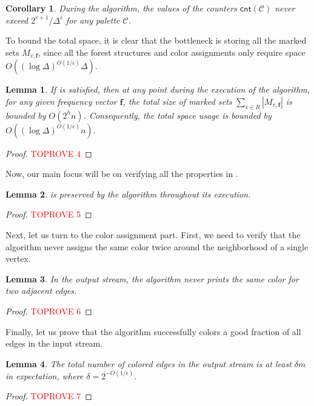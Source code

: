 \documentclass[11pt,a4paper]{article}
\newtheorem{lemma}{Lemma}[section]
\newtheorem{corollary}{Corollary}[section]
\newcommand{\freq}{\mathbf{f}}
\newcommand{\clr}{\mathcal{C}}
\newcommand{\cnt}{\mathsf{cnt}}
\newcommand{\brac}[1]{\left(#1\right)}
\begin{document}
\begin{corollary}\label{cnt-bound}
	During the algorithm, the values of the counters $\cnt(\clr)$ never exceed $2^{r+1} / \Delta^\epsilon$ for any palette $\clr$.
\end{corollary}

To bound the total space, it is clear that the bottleneck is storing all the marked sets \(M_{v, \freq}\), since all the forest structures and color assignments only require space \(O\brac{(\log\Delta)^{O(1/\epsilon)}\Delta}\).

\begin{lemma}
    If  is satisfied, then at any point during the execution of the algorithm, for any given frequency vector $\freq$, the total size of marked sets $\sum_{v\in R}|M_{v, \freq}|$ is bounded by $O(2^h n)$. Consequently, the total space usage is bounded by $O((\log\Delta)^{O(1/\epsilon)} n)$.
\end{lemma}

\begin{proof}\textcolor{red}{TOPROVE 4}\end{proof}
Now, our main focus will be on verifying all the properties in .
\begin{lemma}\label{verify-inv}
	 is preserved by the algorithm throughout its execution.
\end{lemma}
\begin{proof}\textcolor{red}{TOPROVE 5}\end{proof}

Next, let us turn to the color assignment part. First, we need to verify that the algorithm never assigns the same color twice around the neighborhood of a single vertex.
\begin{lemma}
	In the output stream, the algorithm never prints the same color for two adjacent edges.
\end{lemma}
\begin{proof}\textcolor{red}{TOPROVE 6}\end{proof}

Finally, let us prove that the algorithm successfully colors a good fraction of all edges in the input stream.
\begin{lemma}
	The total number of colored edges in the output stream is at least $\delta m$ in expectation, where $\delta = 2^{-O(1/\epsilon)}$.
\end{lemma}
\begin{proof}\textcolor{red}{TOPROVE 7}\end{proof}
\end{document}
